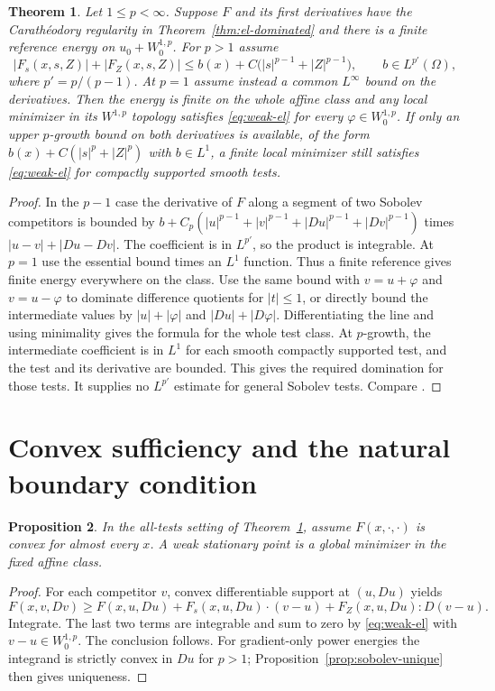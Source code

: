 \documentclass[11pt,oneside,openany]{book}
\theoremstyle{plain}
\newtheorem{theorem}{Theorem}[chapter]
\newtheorem{proposition}[theorem]{Proposition}
\theoremstyle{definition}
\theoremstyle{remark}
\begin{document}
\begin{theorem}\label{thm:el-sobolev}
Let \(1\le p<\infty\). Suppose \(F\) and its first derivatives
have the Carath\'eodory regularity in
Theorem~\ref{thm:el-dominated} and there is a finite reference
energy on \(u_0+W^{1,p}_0\). For \(p>1\) assume
\[
 |F_s(x,s,Z)|+|F_Z(x,s,Z)|
 \le b(x)+C\bigl(|s|^{p-1}+|Z|^{p-1}\bigr),
 \qquad b\in L^{p'}(\Omega),
\]
where \(p'=p/(p-1)\). At \(p=1\) assume instead a common
\(L^\infty\) bound on the derivatives.
Then the energy is finite on the whole affine class and any
local minimizer in its \(W^{1,p}\) topology satisfies
\eqref{eq:weak-el} for every \(\varphi\in W^{1,p}_0\).
If only an upper \(p\)-growth bound on both derivatives is
available, of the form
\(b(x)+C(|s|^p+|Z|^p)\) with \(b\in L^1\),
a finite local minimizer still satisfies \eqref{eq:weak-el}
for compactly supported smooth tests.
\end{theorem}

\begin{proof}
In the \(p-1\) case the derivative of \(F\) along a segment
of two Sobolev competitors is bounded by
\(b+C_p(|u|^{p-1}+|v|^{p-1}+|Du|^{p-1}+|Dv|^{p-1})\)
times \(|u-v|+|Du-Dv|\). The coefficient is in \(L^{p'}\),
so the product is integrable. At \(p=1\) use the essential
bound times an \(L^1\) function. Thus a finite reference
gives finite energy everywhere on the class. Use the same
bound with \(v=u+\varphi\) and \(v=u-\varphi\) to dominate
difference quotients for \(|t|\le1\), or directly bound the
intermediate values by \(|u|+|\varphi|\) and
\(|Du|+|D\varphi|\). Differentiating the line and using
minimality gives the formula for the whole test class.
At \(p\)-growth, the intermediate coefficient is in
\(L^1\) for each smooth compactly supported test, and the
test and its derivative are bounded. This gives the required
domination for those tests. It supplies no \(L^{p'}\)
estimate for general Sobolev tests. Compare
\cite[Theorem 3.13 and Remark 3.14]{Dacorogna}.
\end{proof}

\section{Convex sufficiency and the natural boundary condition}
\label{v08-08}

\begin{proposition}\label{prop:weak-el-sufficient}
In the all-tests setting of Theorem~\ref{thm:el-sobolev},
assume \(F(x,\cdot,\cdot)\) is convex for almost every \(x\).
A weak stationary point is a global minimizer in the fixed
affine class.
\end{proposition}
\begin{proof}
For each competitor \(v\), convex differentiable support at
\((u,Du)\) yields
\[
 F(x,v,Dv)\ge F(x,u,Du)
       + F_s(x,u,Du)\cdot(v-u)
       + F_Z(x,u,Du):D(v-u).
\]
Integrate. The last two terms are integrable and sum to zero
by \eqref{eq:weak-el} with \(v-u\in W^{1,p}_0\).
The conclusion follows. For gradient-only power energies
the integrand is strictly convex in \(Du\) for \(p>1\);
Proposition~\ref{prop:sobolev-unique} then gives uniqueness.
\end{proof}
\end{document}
